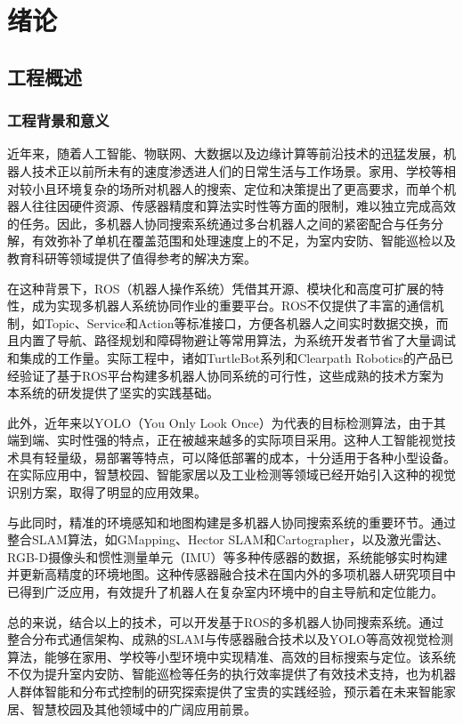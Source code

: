 \chapter{绪论}

\section{工程概述}

\subsection{工程背景和意义}
近年来，随着人工智能、物联网、大数据以及边缘计算等前沿技术的迅猛发展，机器人技术正以前所未有的速度渗透进人们的日常生活与工作场景。家用、学校等相对较小且环境复杂的场所对机器人的搜索、定位和决策提出了更高要求，而单个机器人往往因硬件资源、传感器精度和算法实时性等方面的限制，难以独立完成高效的任务。因此，多机器人协同搜索系统通过多台机器人之间的紧密配合与任务分解，有效弥补了单机在覆盖范围和处理速度上的不足，为室内安防、智能巡检以及教育科研等领域提供了值得参考的解决方案。%

在这种背景下，ROS（机器人操作系统）凭借其开源、模块化和高度可扩展的特性，成为实现多机器人系统协同作业的重要平台。ROS不仅提供了丰富的通信机制，如Topic、Service和Action等标准接口，方便各机器人之间实时数据交换，而且内置了导航、路径规划和障碍物避让等常用算法，为系统开发者节省了大量调试和集成的工作量。实际工程中，诸如TurtleBot系列和Clearpath Robotics的产品已经验证了基于ROS平台构建多机器人协同系统的可行性，这些成熟的技术方案为本系统的研发提供了坚实的实践基础。

此外，近年来以YOLO（You Only Look Once）为代表的目标检测算法，由于其端到端、实时性强的特点，正在被越来越多的实际项目采用。这种人工智能视觉技术具有轻量级，易部署等特点，可以降低部署的成本，十分适用于各种小型设备。在实际应用中，智慧校园、智能家居以及工业检测等领域已经开始引入这种的视觉识别方案，取得了明显的应用效果。%

与此同时，精准的环境感知和地图构建是多机器人协同搜索系统的重要环节。通过整合SLAM算法，如GMapping、Hector SLAM和Cartographer，以及激光雷达、RGB-D摄像头和惯性测量单元（IMU）等多种传感器的数据，系统能够实时构建并更新高精度的环境地图。这种传感器融合技术在国内外的多项机器人研究项目中已得到广泛应用，有效提升了机器人在复杂室内环境中的自主导航和定位能力。%

总的来说，结合以上的技术，可以开发基于ROS的多机器人协同搜索系统。通过整合分布式通信架构、成熟的SLAM与传感器融合技术以及YOLO等高效视觉检测算法，能够在家用、学校等小型环境中实现精准、高效的目标搜索与定位。该系统不仅为提升室内安防、智能巡检等任务的执行效率提供了有效技术支持，也为机器人群体智能和分布式控制的研究探索提供了宝贵的实践经验，预示着在未来智能家居、智慧校园及其他领域中的广阔应用前景。%

